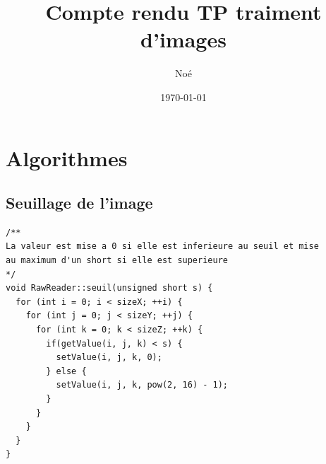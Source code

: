 \documentclass [a4 paper,11pt]{report}
\title {Compte rendu TP traiment d'images}
\author {
\bsc{LE PHILIPPE} Noé\\
}
\date{\today}
\begin{document}
\makeatletter
 
\maketitle
\section*{Algorithmes}

\subsection*{Seuillage de l'image}
\begin{lstlisting}
/**
La valeur est mise a 0 si elle est inferieure au seuil et mise
au maximum d'un short si elle est superieure
*/
void RawReader::seuil(unsigned short s) {
  for (int i = 0; i < sizeX; ++i) {
    for (int j = 0; j < sizeY; ++j) {
      for (int k = 0; k < sizeZ; ++k) {
        if(getValue(i, j, k) < s) {
          setValue(i, j, k, 0);
        } else {
          setValue(i, j, k, pow(2, 16) - 1);
        }
      }
    }
  }
}
\end{lstlisting}
\newpage
\end{document}
